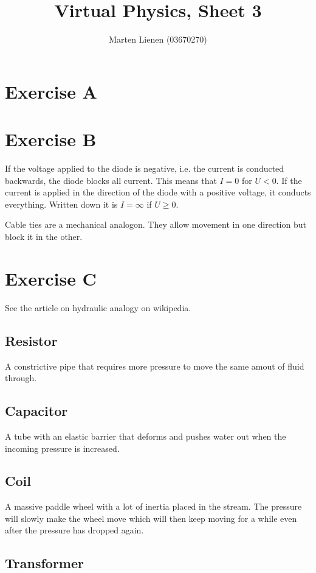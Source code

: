 \documentclass[10pt,a4paper]{article}
\title{Virtual Physics, Sheet 3}
\author{Marten Lienen (03670270)}
\begin{document}
\maketitle

\section*{Exercise A}

\section*{Exercise B}

If the voltage applied to the diode is negative, i.e. the current is conducted backwards, the diode blocks all current.
This means that $I = 0$ for $U < 0$.
If the current is applied in the direction of the diode with a positive voltage, it conducts everything.
Written down it is $I = \infty$ if $U \ge 0$.

Cable ties are a mechanical analogon.
They allow movement in one direction but block it in the other.

\section*{Exercise C}

See the article on hydraulic analogy on wikipedia.

\subsection*{Resistor}

A constrictive pipe that requires more pressure to move the same amout of fluid through.

\subsection*{Capacitor}

A tube with an elastic barrier that deforms and pushes water out when the incoming pressure is increased.

\subsection*{Coil}

A massive paddle wheel with a lot of inertia placed in the stream.
The pressure will slowly make the wheel move which will then keep moving for a while even after the pressure has dropped again.

\subsection*{Transformer}
\end{document}
